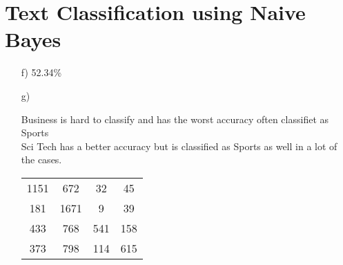 \documentclass{article}
\begin{document}
\section{Text Classification using Naive Bayes}
\begin{itemize}
\item[f)]
52.34\%
\item[g)]
\begin{table}[H] Business is hard to classify and has the worst accuracy often classifiet as Sports\\ Sci Tech has a better accuracy but is classified as Sports as well in a lot of the cases.
\begin{tabular}{c c c c}
1151& 672& 32& 45\\ 181& 1671& 9& 39\\ 433& 768& 541& 158\\ 373& 798& 114& 615\\
\end{tabular}
\end{table}
\end{itemize}


\end{document}
